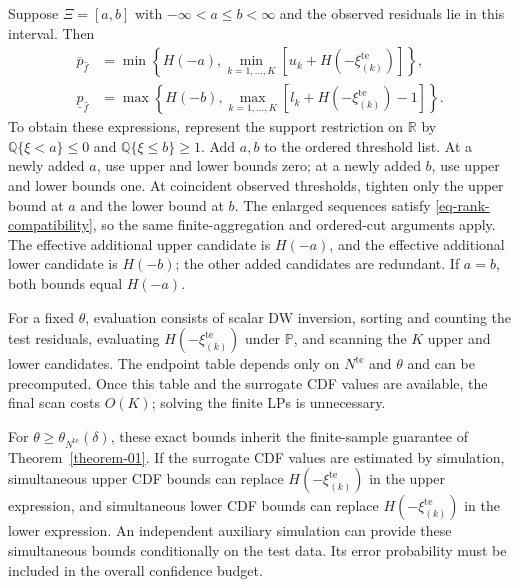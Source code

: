 \documentclass[review,11pt,3p,authoryear,nopreprintline]{elsarticle}
\begin{document}
\begin{remark}
  \label{rem-interval-support}
  Suppose $\Xi=[a,b]$ with $-\infty<a\le b<\infty$ and the observed residuals lie in this interval. Then
  \begin{align}
    \overline p_{\hat f}
    &=\min\left\{H(-a),\min_{k=1,\ldots,K}[u_k+H\left(-\xi_{(k)}^{\mathrm{te}}\right)]\right\},
    \label{eq-dw-interval-upper}\\
    \underline p_{\hat f}
    &=\max\left\{H(-b),\max_{k=1,\ldots,K}[l_k+H\left(-\xi_{(k)}^{\mathrm{te}}\right)-1]\right\}.
    \label{eq-dw-interval-lower}
  \end{align}
  To obtain these expressions, represent the support restriction on $\mathbb R$ by
  $\mathbb Q\{\xi<a\}\le0$ and $\mathbb Q\{\xi\le b\}\ge1$.
  Add $a,b$ to the ordered threshold list. At a newly added $a$, use upper and lower bounds zero; at a newly added $b$, use upper and lower bounds one. At coincident observed thresholds, tighten only the upper bound at $a$ and the lower bound at $b$. The enlarged sequences satisfy \eqref{eq-rank-compatibility}, so the same finite-aggregation and ordered-cut arguments apply. The effective additional upper candidate is $H(-a)$, and the effective additional lower candidate is $H(-b)$; the other added candidates are redundant. If $a=b$, both bounds equal $H(-a)$.
\end{remark}

For a fixed $\theta$, evaluation consists of scalar DW inversion, sorting and counting the test residuals, evaluating $H\left(-\xi_{(k)}^{\mathrm{te}}\right)$ under $\mathbb P$, and scanning the $K$ upper and lower candidates. The endpoint table depends only on $N^{\mathrm{te}}$ and $\theta$ and can be precomputed. Once this table and the surrogate CDF values are available, the final scan costs $O(K)$; solving the finite LPs is unnecessary.

For $\theta\ge\theta_{N^{\mathrm{te}}}(\delta)$, these exact bounds inherit the finite-sample guarantee of Theorem~\ref{theorem-01}. If the surrogate CDF values are estimated by simulation, simultaneous upper CDF bounds can replace $H\left(-\xi_{(k)}^{\mathrm{te}}\right)$ in the upper expression, and simultaneous lower CDF bounds can replace $H\left(-\xi_{(k)}^{\mathrm{te}}\right)$ in the lower expression. An independent auxiliary simulation can provide these simultaneous bounds conditionally on the test data. Its error probability must be included in the overall confidence budget.






\end{document}
